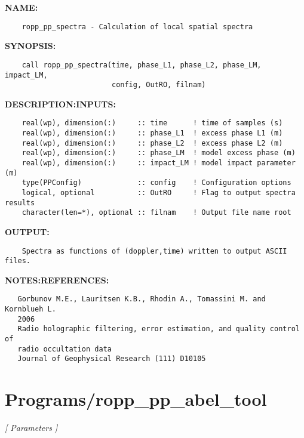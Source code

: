 \label{ch:robo86}
\label{ch:Preprocessing_ropp_pp_spectra}
\textbf{NAME:}\hspace{0.08in}\begin{Verbatim}
    ropp_pp_spectra - Calculation of local spatial spectra
\end{Verbatim}
\textbf{SYNOPSIS:}\hspace{0.08in}\begin{Verbatim}
    call ropp_pp_spectra(time, phase_L1, phase_L2, phase_LM, impact_LM,
                         config, OutRO, filnam)
\end{Verbatim}
\textbf{DESCRIPTION:}\hspace{0.08in}\textbf{INPUTS:}\hspace{0.08in}\begin{Verbatim}
    real(wp), dimension(:)     :: time      ! time of samples (s)
    real(wp), dimension(:)     :: phase_L1  ! excess phase L1 (m)
    real(wp), dimension(:)     :: phase_L2  ! excess phase L2 (m)
    real(wp), dimension(:)     :: phase_LM  ! model excess phase (m)
    real(wp), dimension(:)     :: impact_LM ! model impact parameter (m)
    type(PPConfig)             :: config    ! Configuration options
    logical, optional          :: OutRO     ! Flag to output spectra results
    character(len=*), optional :: filnam    ! Output file name root
\end{Verbatim}
\textbf{OUTPUT:}\hspace{0.08in}\begin{Verbatim}
    Spectra as functions of (doppler,time) written to output ASCII files.
\end{Verbatim}
\textbf{NOTES:}\hspace{0.08in}\textbf{REFERENCES:}\hspace{0.08in}\begin{Verbatim}
   Gorbunov M.E., Lauritsen K.B., Rhodin A., Tomassini M. and Kornblueh L.
   2006
   Radio holographic filtering, error estimation, and quality control of
   radio occultation data
   Journal of Geophysical Research (111) D10105
\end{Verbatim}
\section{Programs/ropp\_pp\_abel\_tool}
\textsl{[ Parameters ]}

